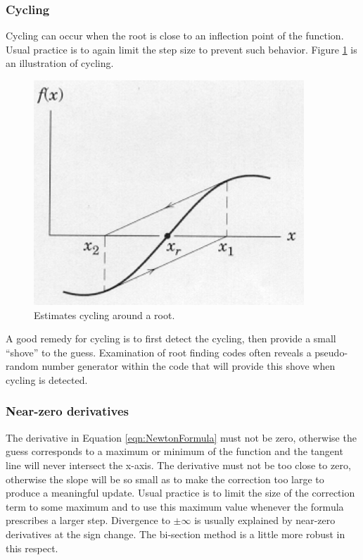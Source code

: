 \subsubsection{Cycling}
Cycling can occur when the root is close to an inflection point of the function.  
Usual practice is to again limit the step size to prevent such behavior.  
Figure \ref{fig:RootCycling} is an illustration of cycling.
\begin{figure}[h!] %
   \centering
   \includegraphics[width=4in]{./3-Differentation/RootCycling.jpg} 
   \caption{Estimates cycling around a root.}
   \label{fig:RootCycling}
\end{figure}
A good remedy for cycling is to first detect the cycling, then provide a small ``shove'' to the guess.  
Examination of root finding codes often reveals a pseudo-random number generator within the code that will provide this shove when cycling is detected.
\subsubsection{Near-zero derivatives}
The derivative in Equation \ref{eqn:NewtonFormula} must not be zero, otherwise the guess corresponds to a maximum or minimum of the function and the tangent line will never intersect the x-axis.    
The derivative must not be too close to zero, otherwise the slope will be so small as to make the correction too large to produce a meaningful update.  Usual practice is to limit the size of the correction term to some maximum and to use this maximum value whenever the formula prescribes a larger step.
Divergence to $\pm\infty$ is usually explained by near-zero derivatives at the sign change. 
The bi-section method is a little more robust in this respect.

